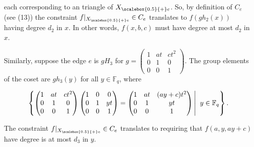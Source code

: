 each corresponding to an triangle of ${X}_{\scalebox{0.5}{+}e}$. So, by definition of $C_{e}$ (see (13)) the constraint $f|_{{X}_{\scalebox{0.5}{+}e}}\in C_{e}$ translates to $f(gh_{2}(x))$ having degree $d_{2}$ in $x$. In other words, $f(x,b,c)$ must have degree at most $d_{2}$ in $x$.\par




Similarly, suppose the edge $e$ is $gH_{3}$ for $g=\begin{pmatrix}1&at&ct^{2}\\
0&1&0\\
0&0&1\end{pmatrix}$. The group elements of the coset are $gh_{3}(y)$ for all $y\in\mathbb{F}_{q}$, where\par


\[\begin{gathered}
\displaystyle\left\{\begin{pmatrix}1&at&ct^{2}\\
0&1&0\\
0&0&1\end{pmatrix}\begin{pmatrix}1&0&0\\
0&1&yt\\
0&0&1\end{pmatrix}=\begin{pmatrix}1&at&(ay+c)t^{2}\\
0&1&yt\\
0&0&1\end{pmatrix}\left|\;\vphantom{\begin{pmatrix}1&at&ct^{2}\\
0&1&0\\
0&0&1\end{pmatrix}\begin{pmatrix}1&0&0\\
0&1&yt\\
0&0&1\end{pmatrix}=\begin{pmatrix}1&at&(ay+c)t^{2}\\
0&1&yt\\
0&0&1\end{pmatrix}y\in\mathbb{F}_{q}}\right.y\in\mathbb{F}_{q}\right\}.
\end{gathered}\]


The constraint $f|_{{X}_{\scalebox{0.5}{+}e}}\in C_{e}$ translates to requiring that $f(a,y,ay+c)$ have degree is at most $d_{3}$ in $y$.\par




